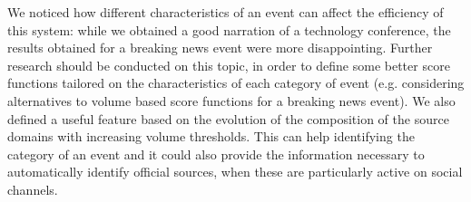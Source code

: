 \documentclass{sig-alternate}
\begin{document}
We noticed how different characteristics of an event can affect the efficiency of this system: while we obtained a good narration of a technology conference, the results obtained for a breaking news event were more disappointing. Further research should be conducted on this topic, in order to define some better score functions tailored on the characteristics of each category of event (e.g. considering alternatives to volume based score functions for a breaking news event). We also defined a useful feature based on the evolution of the composition of the source domains with increasing volume thresholds. This can help identifying the category of an event and it could also provide the information necessary to automatically identify official sources, when these are particularly active on social channels.


\nocite{*}


\balancecolumns
\end{document}
